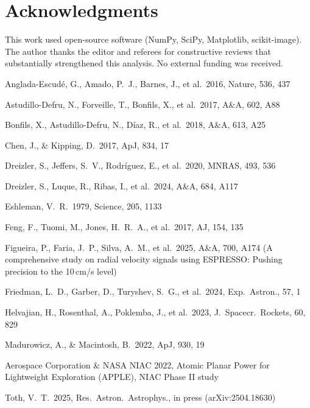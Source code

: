 \documentclass[twocolumn,10pt]{article}
\newcommand{\acknowledgments}{\section*{Acknowledgments}}
\begin{document}
\acknowledgments
This work used open-source software (NumPy, SciPy, Matplotlib, scikit-image).
The author thanks the editor and referees for constructive reviews that
substantially strengthened this analysis. No external funding was received.

\begin{thebibliography}{}

Anglada-Escud\'e, G., Amado, P.~J., Barnes, J., et al.\ 2016, Nature, 536, 437

Astudillo-Defru, N., Forveille, T., Bonfils, X., et al.\ 2017, A\&A, 602, A88

Bonfils, X., Astudillo-Defru, N., D\'iaz, R., et al.\ 2018, A\&A, 613, A25

Chen, J., \& Kipping, D.\ 2017, ApJ, 834, 17

Dreizler, S., Jeffers, S.~V., Rodr\'iguez, E., et al.\ 2020, MNRAS, 493, 536

Dreizler, S., Luque, R., Ribas, I., et al.\ 2024, A\&A, 684, A117

Eshleman, V.~R.\ 1979, Science, 205, 1133

Feng, F., Tuomi, M., Jones, H.~R.~A., et al.\ 2017, AJ, 154, 135

Figueira, P., Faria, J.~P., Silva, A.~M., et al.\ 2025, A\&A, 700, A174
(A comprehensive study on radial velocity signals using ESPRESSO: Pushing
precision to the 10\,cm/s level)

Friedman, L.~D., Garber, D., Turyshev, S.~G., et al.\ 2024, Exp.\ Astron., 57, 1

Helvajian, H., Rosenthal, A., Poklemba, J., et al.\ 2023, J.\ Spacecr.\ Rockets, 60, 829

Madurowicz, A., \& Macintosh, B.\ 2022, ApJ, 930, 19

Aerospace Corporation \& NASA NIAC 2022, Atomic Planar Power for Lightweight Exploration (APPLE), NIAC Phase II study

Toth, V.~T.\ 2025, Res.\ Astron.\ Astrophys., in press (arXiv:2504.18630)


\end{thebibliography}
\end{document}

